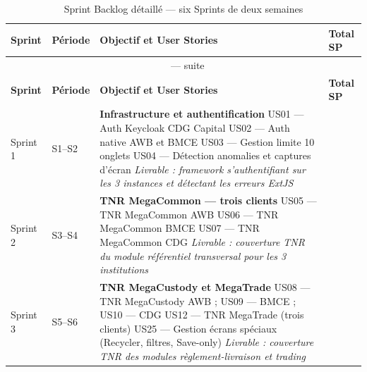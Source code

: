\documentclass[12pt, a4paper]{report}
\begin{document}
\begingroup
\small
\setlength{\extrarowheight}{2pt}
\renewcommand{\arraystretch}{1.1}
\begin{longtable}{@{}p{1.5cm}p{1.5cm}p{\dimexpr\linewidth-1.5cm-1.5cm-1.5cm-6\tabcolsep\relax}>{\centering\arraybackslash}p{1.5cm}@{}}
\caption{Sprint Backlog détaillé — six Sprints de deux semaines}
\label{tab:sprint_backlog}\\
\toprule
\textbf{Sprint} & \textbf{Période} & \textbf{Objectif et User Stories} & \textbf{Total SP} \\
\midrule
\endfirsthead
\multicolumn{4}{c}{\tablename~\thetable{} — suite}\\
\toprule
\textbf{Sprint} & \textbf{Période} & \textbf{Objectif et User Stories} & \textbf{Total SP} \\
\midrule
\endhead
\bottomrule
\endlastfoot

Sprint 1
  & S1–S2
  & \textbf{Infrastructure et authentification}\newline
    {\footnotesize
    US01 — Auth Keycloak CDG Capital\newline
    US02 — Auth native AWB et BMCE\newline
    US03 — Gestion limite 10 onglets\newline
    US04 — Détection anomalies et captures d'écran\newline
    \textit{Livrable : framework s'authentifiant sur les 3 instances et détectant les erreurs ExtJS}}
  & 16 \tabularnewline[4pt]

Sprint 2
  & S3–S4
  & \textbf{TNR MegaCommon — trois clients}\newline
    {\footnotesize
    US05 — TNR MegaCommon AWB\newline
    US06 — TNR MegaCommon BMCE\newline
    US07 — TNR MegaCommon CDG\newline
    \textit{Livrable : couverture TNR du module référentiel transversal pour les 3 institutions}}
  & 24 \tabularnewline[4pt]

Sprint 3
  & S5–S6
  & \textbf{TNR MegaCustody et MegaTrade}\newline
    {\footnotesize
    US08 — TNR MegaCustody AWB ; US09 — BMCE ; US10 — CDG\newline
    US12 — TNR MegaTrade (trois clients)\newline
    US25 — Gestion écrans spéciaux (Recycler, filtres, Save-only)\newline
    \textit{Livrable : couverture TNR des modules règlement-livraison et trading}}
  & 34 \tabularnewline[4pt]


\end{longtable}
\end{document}
